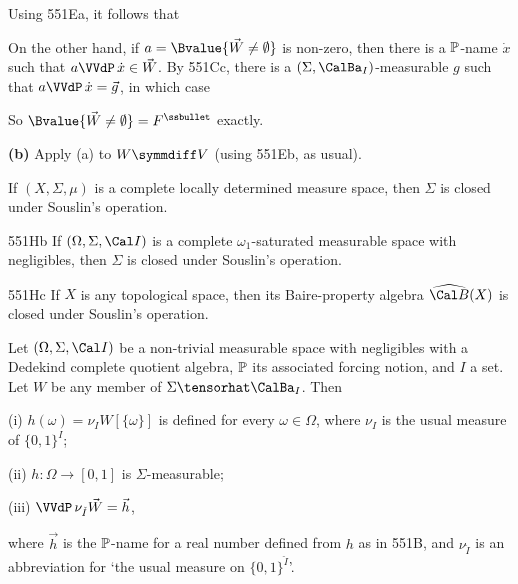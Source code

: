 {\medskip

 Using 551Ea, it follows that


\noindent On the other hand, if $a=\Bvalue{\vec W\ne\emptyset}$ is non-zero,
then there is a $\Bbb P$-name $\dot x$ such that $a\VVdP\,\dot x\in\vec W$.   By
551Cc, there is a $(\Sigma,\CalBa_I)$-measurable $g$ such that
$a\VVdP\,\dot x=\vec g$, in which case


\noindent So $\Bvalue{\vec W\ne\emptyset}=F^{\ssbullet}$ exactly.

\medskip

{\bf (b)} Apply (a) to $W\symmdiff V$ (using 551Eb, as usual).
}%

  If $(X,\Sigma,\mu)$ is a complete locally
determined measure space, then $\Sigma$ is closed under Souslin's
operation.

\spheader 551Hb If $(\Omega,\Sigma,\Cal I)$ is a complete
$\omega_1$-saturated
measurable space with negligibles, then $\Sigma$ is closed under Souslin's
operation.

\spheader 551Hc If $X$ is any topological space, then its Baire-property
algebra $\widehat{\Cal B}(X)$ is closed under Souslin's
operation.

 Let $(\Omega,\Sigma,\Cal I)$ be a
non-trivial measurable space
with negligibles with a Dedekind complete quotient algebra,
$\Bbb P$ its associated forcing notion, and $I$ a set.
Let $W$ be any member of $\Sigma\tensorhat\CalBa_I$.  Then

(i) $h(\omega)=\nu_IW[\{\omega\}]$ is defined for every
$\omega\in\Omega$, where $\nu_I$ is the usual measure of $\{0,1\}^I$;

(ii) $h:\Omega\to[0,1]$ is $\Sigma$-measurable;

(iii) $\VVdP\,\nu_{\check I}\vec W=\vec h$,

\noindent where $\vec h$ is the
$\Bbb P$-name for a real number defined from $h$ as in 551B, 
and $\nu_{\check I}$ is an
abbreviation for `the usual measure on $\{0,1\}^{\check I}$'.

